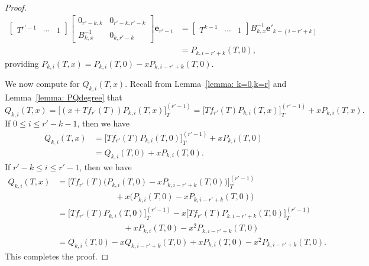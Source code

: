 \documentclass[11pt]{amsart}
\theoremstyle{definition}
\numberwithin{equation}{subsection}
\theoremstyle{plain}
\theoremstyle{plain}
\theoremstyle{plain}
\theoremstyle{plain}
\theoremstyle{plain}
\theoremstyle{plain}
\theoremstyle{plain}
\theoremstyle{plain}
\theoremstyle{plain}
\theoremstyle{plain}
\theoremstyle{plain}
\theoremstyle{plain}
\theoremstyle{definition}
\theoremstyle{definition}
\theoremstyle{definition}
\theoremstyle{remark}
\renewcommand{\(}{\textup{(}}
\renewcommand{\)}{\textup{)}}
\begin{document}
\begin{proof}
    \begin{align*}
        \begin{bmatrix}
          T^{r'-1} & \cdots & 1
        \end{bmatrix}
        \begin{bmatrix}
            0_{r'-k,k} & 0_{r'-k,r'-k} \\
            B_{k,x}^{-1}& 0_{k,r'-k}
        \end{bmatrix}
        \mathbf{e}_{r'-i}
        &=
        \begin{bmatrix}
          T^{k-1} & \cdots & 1
        \end{bmatrix}
        B_{k,x}^{-1}
        \mathbf{e}'_{k-(i-r'+k)}\\
        &=P_{k,i-r'+k}(T,0),
    \end{align*}
providing $P_{k,i}(T,x)=P_{k,i}(T,0)-xP_{k,i-r'+k}(T,0)$.

We now compute for $Q_{k,i}(T,x)$. Recall from Lemma~\ref{lemma: k=0,k=r} and Lemma~\ref{lemma: PQdegree} that
$$Q_{k,i}(T,x)=\big[(x+Tf_{r'}(T))P_{k,i}(T,x)\big]_{T}^{(r'-1)}=\big[Tf_{r'}(T)P_{k,i}(T,x)\big]_T^{(r'-1)}+xP_{k,i}(T,x).$$
If $0\leq i\leq r'-k-1$, then we have
    \begin{align*}
        Q_{k,i}(T,x) &=\big[Tf_{r'}(T)P_{k,i}(T,0)\big]_{T}^{(r'-1)}+xP_{k,i}(T,0)
        \\&=Q_{k,i}(T,0)+xP_{k,i}(T,0).
    \end{align*}
If $r'-k\leq i\leq r'-1$, then we have
    \begin{align*}
        Q_{k,i}(T,x)&=\big[Tf_{r'}(T)\big(P_{k,i}(T,0)-xP_{k,i-r'+k}(T,0)\big)\big]_{T}^{(r'-1)}
        \\&\hspace{7em}
        +x\big(P_{k,i}(T,0)-xP_{k,i-r'+k}(T,0)\big)
        \\&=\big[Tf_{r'}(T)P_{k,i}(T,0)\big]_{T}^{(r'-1)}-x\big[Tf_{r'}(T)P_{k,i-r'+k}(T,0)\big]_{T}^{(r'-1)}
        \\&\hspace{8em}
        +xP_{k,i}(T,0)-x^2P_{k,i-r'+k}(T,0)
        \\&=Q_{k,i}(T,0)-xQ_{k,i-r'+k}(T,0)+xP_{k,i}(T,0)-x^2P_{k,i-r'+k}(T,0).
    \end{align*}
This completes the proof.
\end{proof}
\end{document}

